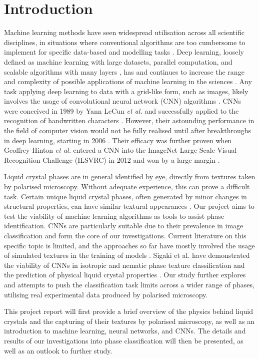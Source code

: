 \documentclass[12pt]{article}
\begin{document}
\section{Introduction}
Machine learning methods have seen widespread utilisation across all scientific disciplines, in situations where conventional algorithms are too cumbersome to implement for specific data-based and modelling tasks \cite{Carleo19}. Deep learning, loosely defined as machine learning with large datasets, parallel computation, and scalable algorithms with many layers \cite{Goodfellow16}, has and continues to increase the range and complexity of possible applications of machine learning in the sciences \cite{Carleo19}. Any task applying deep learning to data with a grid-like form, such as images, likely involves the usage of convolutional neural network (CNN) algorithms \cite{Goodfellow16}. CNNs were conceived in 1989 by Yann LeCun \textit{et al.} and successfully applied to the recognition of handwritten characters \cite{LeCun89}. However, their astounding performance in the field of computer vision would not be fully realised until after breakthroughs in deep learning, starting in 2006 \cite{Goodfellow16}. Their efficacy was further proven when Geoffrey Hinton \textit{et al.} entered a CNN into the ImageNet Large Scale Visual Recognition Challenge (ILSVRC) in 2012 and won by a large margin \cite{ILSVRC15}.

Liquid crystal phases are in general identified by eye, directly from textures taken by polarised microscopy. Without adequate experience, this can prove a difficult task. Certain unique liquid crystal phases, often generated by minor changes in structural properties, can have similar textural appearances \cite{Dierking03}. Our project aims to test the viability of machine learning algorithms as tools to assist phase identification. CNNs are particularly suitable due to their prevalence in image classification and form the core of our investigations. Current literature on this specific topic is limited, and the approaches so far have mostly involved the usage of simulated textures in the training of models \cite{Sigaki20, Minor20}. Sigaki et al. have demonstrated the viability of CNNs in isotropic and nematic phase texture classification and the prediction of physical liquid crystal properties \cite{Sigaki20}. Our study further explores and attempts to push the classification task limits across a wider range of phases, utilising real experimental data produced by polarised microscopy.

This project report will first provide a brief overview of the physics behind liquid crystals and the capturing of their textures by polarised microscopy, as well as an introduction to machine learning, neural networks, and CNNs. The details and results of our investigations into phase classification will then be presented, as well as an outlook to further study.
\end{document}
